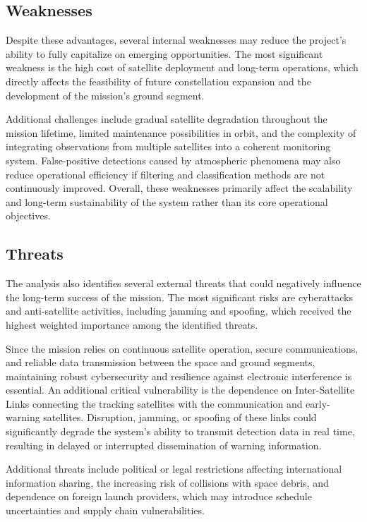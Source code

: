 \subsection{Weaknesses}

Despite these advantages, several internal weaknesses may reduce the project's ability to fully capitalize on emerging opportunities. The most significant weakness is the high cost of satellite deployment and long-term operations, which directly affects the feasibility of future constellation expansion and the development of the mission's ground segment.

Additional challenges include gradual satellite degradation throughout the mission lifetime, limited maintenance possibilities in orbit, and the complexity of integrating observations from multiple satellites into a coherent monitoring system. False-positive detections caused by atmospheric phenomena may also reduce operational efficiency if filtering and classification methods are not continuously improved. Overall, these weaknesses primarily affect the scalability and long-term sustainability of the system rather than its core operational objectives.

\subsection{Threats}

The analysis also identifies several external threats that could negatively influence the long-term success of the mission. The most significant risks are cyberattacks and anti-satellite activities, including jamming and spoofing, which received the highest weighted importance among the identified threats.

Since the mission relies on continuous satellite operation, secure communications, and reliable data transmission between the space and ground segments, maintaining robust cybersecurity and resilience against electronic interference is essential. An additional critical vulnerability is the dependence on Inter-Satellite Links connecting the  tracking satellites with the  communication and early-warning satellites. Disruption, jamming, or spoofing of these links could significantly degrade the system's ability to transmit detection data in real time, resulting in delayed or interrupted dissemination of warning information.

Additional threats include political or legal restrictions affecting international information sharing, the increasing risk of collisions with space debris, and dependence on foreign launch providers, which may introduce schedule uncertainties and supply chain vulnerabilities.

